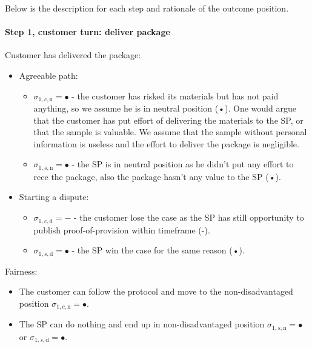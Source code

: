 \documentclass{ieeeaccess}
\begin{document}
Below is the description for each step and rationale of the outcome
position.

\paragraph{Step 1, customer turn: deliver package}\label{step-1-deliver-package}

Customer has delivered the package:

\begin{itemize}
\item
  Agreeable path:

  \begin{itemize}
  
  \item
    \(\sigma_{1, c, \mathrm{n}} = •\) - the customer has risked its
    materials but has not paid anything, so we assume he is in neutral
    position (•). One would argue that the customer has put effort of
    delivering the materials to the SP, or that the sample is valuable.
    We assume that the sample without personal information is useless
    and the effort to deliver the package is negligible.
  \item
    \(\sigma_{1, s, \mathrm{n}} = •\) - the SP is in neutral position as
    he didn't put any effort to rece the package, also the package
    hasn't any value to the SP (•).
  \end{itemize}
\item
  Starting a dispute:

  \begin{itemize}
  
  \item
    \(\sigma_{1, c, \mathrm{d}} = -\) - the customer lose the case as
    the SP has still opportunity to publish proof-of-provision within
    timeframe (-).
  \item
    \(\sigma_{1, s, \mathrm{d}} = •\) - the SP win the case for the same
    reason (•).
  \end{itemize}
\end{itemize}

Fairness:

\begin{itemize}

\item
  The customer can follow the protocol and move to the non-disadvantaged
  position \(\sigma_{1, c, \mathrm{n}} = •\).
\item
  The SP can do nothing and end up in non-disadvantaged position
  \(\sigma_{1, s, \mathrm{n}} = •\) or
  \(\sigma_{1, s, \mathrm{d}} = •\).
\end{itemize}
\end{document}
